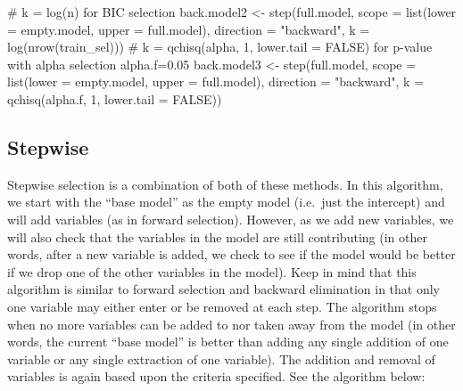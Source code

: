 \documentclass[
  letterpaper,
  DIV=11,
  numbers=noendperiod]{scrreprt}
\newenvironment{Shaded}{\begin{snugshade}}{\end{snugshade}}
\newcommand{\AttributeTok}[1]{\textcolor[rgb]{0.40,0.45,0.13}{#1}}
\newcommand{\CommentTok}[1]{\textcolor[rgb]{0.37,0.37,0.37}{#1}}
\newcommand{\ConstantTok}[1]{\textcolor[rgb]{0.56,0.35,0.01}{#1}}
\newcommand{\DecValTok}[1]{\textcolor[rgb]{0.68,0.00,0.00}{#1}}
\newcommand{\FloatTok}[1]{\textcolor[rgb]{0.68,0.00,0.00}{#1}}
\newcommand{\FunctionTok}[1]{\textcolor[rgb]{0.28,0.35,0.67}{#1}}
\newcommand{\NormalTok}[1]{\textcolor[rgb]{0.00,0.23,0.31}{#1}}
\newcommand{\OtherTok}[1]{\textcolor[rgb]{0.00,0.23,0.31}{#1}}
\newcommand{\StringTok}[1]{\textcolor[rgb]{0.13,0.47,0.30}{#1}}
\begin{document}
\begin{Shaded}
\begin{Highlighting}[]
\CommentTok{\# k = log(n) for BIC selection}
\NormalTok{back.model2 }\OtherTok{\textless{}{-}} \FunctionTok{step}\NormalTok{(full.model,}
                   \AttributeTok{scope =} \FunctionTok{list}\NormalTok{(}\AttributeTok{lower =}\NormalTok{ empty.model,}
                               \AttributeTok{upper =}\NormalTok{ full.model),}
                   \AttributeTok{direction =} \StringTok{"backward"}\NormalTok{, }\AttributeTok{k =} \FunctionTok{log}\NormalTok{(}\FunctionTok{nrow}\NormalTok{(train\_sel))) }\CommentTok{\# k = qchisq(alpha, 1, lower.tail = FALSE) for p{-}value with alpha selection}
\NormalTok{alpha.f}\OtherTok{=}\FloatTok{0.05}
\NormalTok{back.model3 }\OtherTok{\textless{}{-}} \FunctionTok{step}\NormalTok{(full.model,}
                   \AttributeTok{scope =} \FunctionTok{list}\NormalTok{(}\AttributeTok{lower =}\NormalTok{ empty.model,}
                                \AttributeTok{upper =}\NormalTok{ full.model),}
                   \AttributeTok{direction =} \StringTok{"backward"}\NormalTok{, }\AttributeTok{k =} \FunctionTok{qchisq}\NormalTok{(alpha.f, }\DecValTok{1}\NormalTok{, }\AttributeTok{lower.tail =} \ConstantTok{FALSE}\NormalTok{)) }
\end{Highlighting}
\end{Shaded}

\hypertarget{stepwise}{%
\subsection*{Stepwise}\label{stepwise}}

Stepwise selection is a combination of both of these methods. In this
algorithm, we start with the ``base model'' as the empty model
(i.e.~just the intercept) and will add variables (as in forward
selection). However, as we add new variables, we will also check that
the variables in the model are still contributing (in other words, after
a new variable is added, we check to see if the model would be better if
we drop one of the other variables in the model). Keep in mind that this
algorithm is similar to forward selection and backward elimination in
that only one variable may either enter or be removed at each step. The
algorithm stops when no more variables can be added to nor taken away
from the model (in other words, the current ``base model'' is better
than adding any single addition of one variable or any single extraction
of one variable). The addition and removal of variables is again based
upon the criteria specified. See the algorithm below:
\end{document}

